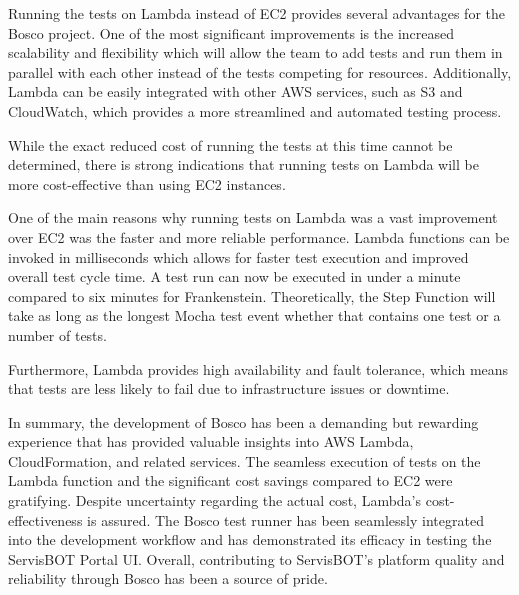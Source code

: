 \documentclass[12pt,a4paper,titlepage]{report}
\begin{document}
Running the tests on Lambda instead of EC2 provides several advantages for the Bosco project. 
One of the most significant improvements is the increased scalability and flexibility which will allow the team to add tests and run them in parallel with each other instead of the tests competing for resources. 
Additionally, Lambda can be easily integrated with other AWS services, such as S3 and CloudWatch, which provides a more streamlined and automated testing process.

While the exact reduced cost of running the tests at this time cannot be determined, there is strong indications that running tests on Lambda will be more cost-effective than using EC2 instances.

One of the main reasons why running tests on Lambda was a vast improvement over EC2 was the faster and more reliable performance. 
Lambda functions can be invoked in milliseconds which allows for faster test execution and improved overall test cycle time. 
A test run can now be executed in under a minute compared to six minutes for Frankenstein. 
Theoretically, the Step Function will take as long as the longest Mocha test event whether that contains one test or a number of tests. 

Furthermore, Lambda provides high availability and fault tolerance, which means that tests are less likely to fail due to infrastructure issues or downtime.

In summary, the development of Bosco has been a demanding but rewarding experience that has provided valuable insights into AWS Lambda, CloudFormation, and related services. 
The seamless execution of tests on the Lambda function and the significant cost savings compared to EC2 were gratifying. 
Despite uncertainty regarding the actual cost, Lambda's cost-effectiveness is assured. 
The Bosco test runner has been seamlessly integrated into the development workflow and has demonstrated its efficacy in testing the ServisBOT Portal UI. 
Overall, contributing to ServisBOT's platform quality and reliability through Bosco has been a source of pride.
\end{document}
